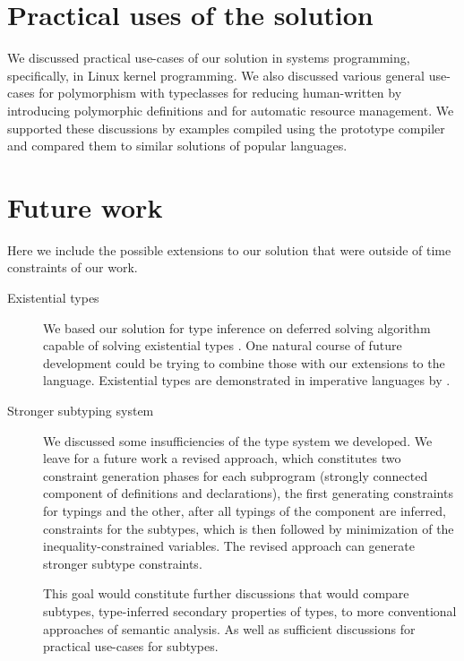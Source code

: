 \section*{Practical uses of the solution}

We discussed practical use-cases of our solution in systems programming, specifically, in Linux kernel programming. We also discussed various general use-cases for polymorphism with typeclasses for reducing human-written by introducing polymorphic definitions and for automatic resource management. We supported these discussions by examples compiled using the prototype compiler and compared them to similar solutions of popular languages.

\section*{Future work}

Here we include the possible extensions to our solution that were outside of time constraints of our work.

\begin{description}
    \item[Existential types] We based our solution for type inference on deferred solving algorithm capable of solving existential types \cite{vytiniotis2011outsidein}. One natural course of future development could be trying to combine those with our extensions to the language. Existential types are demonstrated in imperative languages by \citet{grossman2002existential}.

    \item[Stronger subtyping system] We discussed some insufficiencies of the type system we developed. We leave for a future work a revised approach, which constitutes two constraint generation phases for each subprogram (strongly connected component of definitions and declarations), the first generating constraints for typings and the other, after all typings of the component are inferred, constraints for the subtypes, which is then followed by minimization of the inequality-constrained variables. The revised approach can generate stronger subtype constraints.

    This goal would constitute further discussions that would compare subtypes, type-inferred secondary properties of types, to more conventional approaches of semantic analysis. As well as sufficient discussions for practical use-cases for subtypes.
\end{description}
